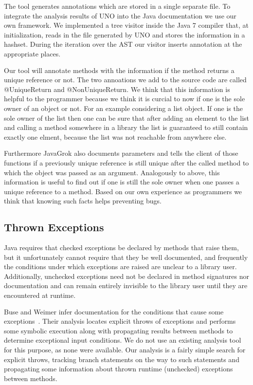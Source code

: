 The tool generates annotations which are stored in a single separate file. 
To integrate the analysis results of UNO into the Java documentation we
use our own framework. We implemented a tree visitor inside the Java 7 
compiler that, at initialization, reads in the file generated by UNO and 
stores the information in a hashset. During the iteration over the AST
our visitor inserts annotation at the appropriate places.

Our tool will annotate methods with the information if the method returns a 
unique reference or not. The two annoations we add to the source code are called
@UniqueReturn and @NonUniqueReturn. We think that this information is helpful to the 
programmer because we think it is curcial to now if one is the sole owner of 
an object or not. For an example considering a list object. If one is the sole
owner of the list then one can be sure that after adding an element to the list
and calling a method somewhere in a library the list is guaranteed to still 
contain exactly one elment, because the list was not reachable from anywhere
else.

Furthermore JavaGrok also documents parameters and tells the client
of those functions if a previously unique reference is still unique after the 
called method to which the object was passed as an argument. Analogously to 
above, this information is useful to find out if one is still the sole owner
when one passes a unique reference to a method. Based on our own experience
as programmers we think that knowing such facts helps preventing bugs.

\subsection{Thrown Exceptions}

Java requires that checked exceptions be declared by methods that raise them,
but it unfortunately cannot require that they be well documented, and
frequently the conditions under which exceptions are raised are unclear to a
library user. Additionally, unchecked exceptions need not be declared in method
signatures nor documentation and can remain entirely invisible to the library
user until they are encountered at runtime.

Buse and Weimer infer documentation for the conditions that cause some
exceptions~\cite{autodoc}.  Their analysis locates explicit throws of
exceptions and performs some symbolic execution along with propagating results
between methods to determine exceptional input conditions.  We do not use an
existing analysis tool for this purpose, as none were available.  Our analysis
is a fairly simple search for explicit throws, tracking branch statements on the
way to such statements and propagating some information about thrown runtime
(unchecked) exceptions between methods.

